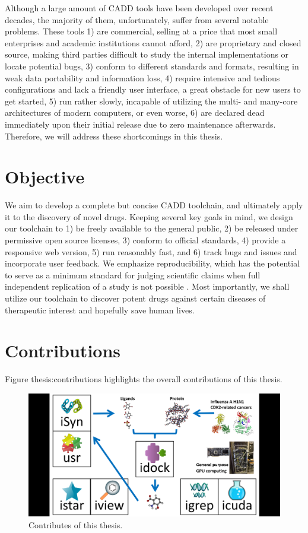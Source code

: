 Although a large amount of CADD tools have been developed over recent decades, the majority of them, unfortunately, suffer from several notable problems. These tools 1) are commercial, selling at a price that most small enterprises and academic institutions cannot afford, 2) are proprietary and closed source, making third parties difficult to study the internal implementations or locate potential bugs, 3) conform to different standards and formats, resulting in weak data portability and information loss, 4) require intensive and tedious configurations and lack a friendly user interface, a great obstacle for new users to get started, 5) run rather slowly, incapable of utilizing the multi- and many-core architectures of modern computers, or even worse, 6) are declared dead immediately upon their initial release due to zero maintenance afterwards. Therefore, we will address these shortcomings in this thesis.

\section{Objective}

We aim to develop a complete but concise CADD toolchain, and ultimately apply it to the discovery of novel drugs. Keeping several key goals in mind, we design our toolchain to 1) be freely available to the general public, 2) be released under permissive open source licenses, 3) conform to official standards, 4) provide a responsive web version, 5) run reasonably fast, and 6) track bugs and issues and incorporate user feedback. We emphasize reproducibility, which has the potential to serve as a minimum standard for judging scientific claims when full independent replication of a study is not possible \citep{965}. Most importantly, we shall utilize our toolchain to discover potent drugs against certain diseases of therapeutic interest and hopefully save human lives.

\section{Contributions}

Figure {thesis:contributions} highlights the overall contributions of this thesis.

\begin{figure}
\begin{center}
\includegraphics[width=\linewidth]{Contributions.png}
\end{center}
\caption{Contributes of this thesis.}
\label{thesis:contributions}
\end{figure}

